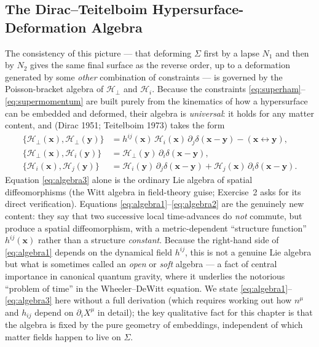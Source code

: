 \documentclass[11pt]{book}
\newcommand{\Ham}{\mathcal{H}}
\theoremstyle{definition}
\theoremstyle{remark}
\begin{document}
\subsection{The Dirac--Teitelboim Hypersurface-Deformation Algebra}
\label{sec:dirac-algebra}

The consistency of this picture --- that deforming $\Sigma$ first by a lapse $N_1$ and then by $N_2$ gives the same final surface as the reverse order, up to a deformation generated by some \emph{other} combination of constraints --- is governed by the Poisson-bracket algebra of $\Ham_\perp$ and $\Ham_i$. Because the constraints \eqref{eq:superham}--\eqref{eq:supermomentum} are built purely from the kinematics of how a hypersurface can be embedded and deformed, their algebra is \emph{universal}: it holds for any matter content, and (Dirac 1951; Teitelboim 1973) takes the form
\begin{align}
\{\Ham_\perp(\mathbf{x}),\Ham_\perp(\mathbf{y})\} &= h^{ij}(\mathbf{x})\,\Ham_i(\mathbf{x})\,\partial_j\delta(\mathbf{x}-\mathbf{y}) - (\mathbf{x}\leftrightarrow\mathbf{y}), \label{eq:algebra1}\\
\{\Ham_\perp(\mathbf{x}),\Ham_i(\mathbf{y})\} &= \Ham_\perp(\mathbf{y})\,\partial_i\delta(\mathbf{x}-\mathbf{y}), \label{eq:algebra2}\\
\{\Ham_i(\mathbf{x}),\Ham_j(\mathbf{y})\} &= \Ham_i(\mathbf{y})\,\partial_j\delta(\mathbf{x}-\mathbf{y}) + \Ham_j(\mathbf{x})\,\partial_i\delta(\mathbf{x}-\mathbf{y}). \label{eq:algebra3}
\end{align}
Equation \eqref{eq:algebra3} alone is the ordinary Lie algebra of spatial diffeomorphisms (the Witt algebra in field-theory guise; Exercise~2 asks for its direct verification). Equations \eqref{eq:algebra1}--\eqref{eq:algebra2} are the genuinely new content: they say that two successive local time-advances do \emph{not} commute, but produce a spatial diffeomorphism, with a metric-dependent ``structure function'' $h^{ij}(\mathbf{x})$ rather than a structure \emph{constant}. Because the right-hand side of \eqref{eq:algebra1} depends on the dynamical field $h^{ij}$, this is not a genuine Lie algebra but what is sometimes called an \emph{open} or \emph{soft} algebra --- a fact of central importance in canonical quantum gravity, where it underlies the notorious ``problem of time'' in the Wheeler--DeWitt equation. We state \eqref{eq:algebra1}--\eqref{eq:algebra3} here without a full derivation (which requires working out how $n^\mu$ and $h_{ij}$ depend on $\partial_iX^\mu$ in detail); the key qualitative fact for this chapter is that the algebra is fixed by the pure geometry of embeddings, independent of which matter fields happen to live on $\Sigma$.
\end{document}
